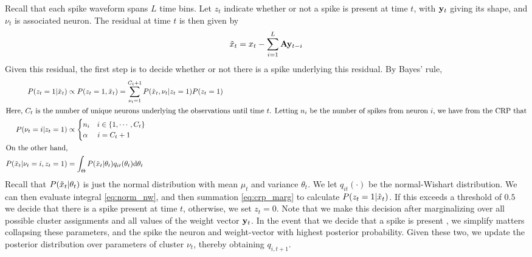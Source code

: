 Recall that each spike waveform spans $L$ time bins. 
Let $z_t$ indicate whether or not a spike is present at time $t$, with $\mathbf{y}_t$ giving its shape, and $\nu_t$ is associated neuron. 
The residual at time $t$ is then given by
\begin{align}
  \tilde{x}_t = x_t - \sum_{i=1}^L \mathbf{A}\mathbf{y}_{t-i} \label{eq:resid}
\end{align}
Given this residual, the first step is to decide whether or not there is a spike underlying this residual.
By Bayes' rule,
\begin{align}
  P(z_t = 1 | \tilde{x}_t)  &\propto P(z_t = 1, \tilde{x}_t) = \sum_{\nu_t = 1}^{C_t+1} P(\tilde{x}_t, {\nu_t} | z_t = 1) P(z_t = 1) \\
\intertext{Here, $C_t$ is the number of unique neurons underlying the observations until time $t$. Letting $n_i$ be the number of spikes from neuron $i$,
we have from the CRP that}
  P({\nu_t} = i | z_t = 1) & \propto 
  \begin{cases}
   n_i \quad i \in \{1,\cdots, C_t\} \\
   \alpha \quad\ i = C_t + 1 \\
  \end{cases}  \label{eq:crp_marg}\\
\intertext{On the other hand,}
  P(\tilde{x}_t | {\nu_t = i} , z_t = 1) &= \int_{\Theta} P(\tilde{x}_t | \theta_t) q_{it} (\theta_t) \mathrm{d} \theta_t  \label{eq:norm_nw}
\end{align}
Recall that  $P(\tilde{x}_t | \theta_t)$ is just the normal distribution with mean $\mu_t$ and variance $\theta_t$. We let $q_{it}(\cdot)$ be the normal-Wishart
distribution. %
We can then evaluate integral \eqref{eq:norm_nw}, and then summation \eqref{eq:crp_marg} to calculate $P(z_t = 1 | \tilde{x}_t)$. 
If this exceeds a threshold of $0.5$ we decide that there is a spike present at time $t$, otherwise, we set $z_t = 0$.
Note that we make this decision after marginalizing over all possible cluster assignments and all values of the weight vector $\mathbf{y}_t$.
In the event that we decide that a spike is present , we simplify matters collapsing these parameters, and the spike the neuron and weight-vector
with highest posterior probability. Given these two, we update the posterior distribution over parameters of cluster $\nu_t$, thereby obtaining
$q_{i,t+1}$.
